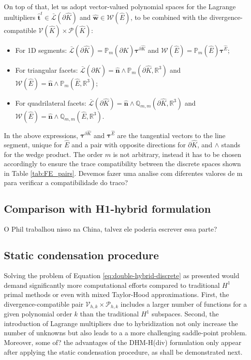\documentclass[english,11pt,3p,number,sort&compress]{elsarticle}
\newcommand{\giovane}{\color{red}{\bf\Large GA} \color{cyan} }
\newcommand{\nathan}{\color{red}{\bf\Large NS} \color{cyan} }
\begin{document}
On top of that, let us adopt vector-valued polynomial spaces for the Lagrange multipliers $\bm{\hat{t}}^t \in \bar{\mathcal{L}}(\partial \hat{K})$ and $\bm{\hat{w}} \in \mathcal{W}(\hat{E})$, to be combined with the divergence-compatible $\mathcal{V}(\hat{K})\times\mathcal{P}(\hat{K})$:
\begin{itemize}
	\item For 1D segments: $\bar{\mathcal{L}}(\partial \hat{K})=\mathbb{P}_m(\partial \hat{K})\bm{\tau}^{\partial\hat{K}}$ and $\mathcal{W}(\hat{E})=\mathbb{P}_m(\hat{E})\bm{\tau}^{\hat{E}}$;
	\item For triangular facets: $\bar{\mathcal{L}}(\partial \hat{K})=\bm{\hat{n}} \wedge \mathbb{P}_m(\partial \hat{K},\mathbb{R}^3)$ and $\mathcal{W}(\hat{E})=\bm{\hat{n}} \wedge \mathbb{P}_m(\hat{E},\mathbb{R}^3)$;
	\item For quadrilateral facets: $\bar{\mathcal{L}}(\partial \hat{K})=\bm{\hat{n}} \wedge \mathbb{Q}_{m,m}(\partial \hat{K},\mathbb{R}^3)$ and $\mathcal{W}(\hat{E})=\bm{\hat{n}} \wedge \mathbb{Q}_{m,m}(\hat{E},\mathbb{R}^3)$.
\end{itemize}

\noindent In the above expressions, $\bm{\tau}^{\partial\hat{K}}$ and $\bm{\tau}^{\hat{E}}$ are the tangential vectors to the line segment, unique for $\hat{E}$ and a pair with opposite directions for $\partial\hat{K}$, and $\wedge$ stands for the wedge product. The order $m$ is not arbitrary, instead it has to be chosen accordingly to ensure the trace compatibility between the discrete spaces shown in Table \ref{tab:FE_pairs}. {\giovane Devemos fazer uma analise com diferentes valores de m para verificar a compatibilidade do traco?}

\subsection{Comparison with H1-hybrid formulation}

{\giovane O Phil trabalhou nisso na China, talvez ele poderia escrever essa parte?}

\subsection{Static condensation procedure} \label{sec:static-condensation}

Solving the problem of Equation \eqref{eq:double-hybrid-discrete} as presented would demand significantly more computational efforts compared to traditional $H^1$ primal methods or even with mixed Taylor-Hood approximations. First, the divergence-compatible pair $\mathcal{V}_{h,k} \times \mathcal{P}_{h,k}$ includes a larger number of functions for a given polynomial order $k$ than the traditional $H^1$ subspaces. Second, the introduction of Lagrange multipliers due to hybridization not only increase the number of unknowns but also leads to a a more challenging saddle-point problem. Moreover, {\nathan some of?} the advantages of the DHM-H(div) formulation only appear after applying the static condensation procedure, as shall be demonstrated next.
\end{document}
